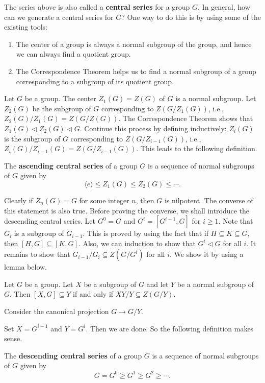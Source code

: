 The series above is also called a \textbf{central series} for a group $G$.
In general, how can we generate a central series for $ G $? One way to do this is by using some of the existing tools: 
\begin{enumerate}[(1)]
	\item The center of a group is always a normal subgroup of the group, and hence we can always find a quotient group.
	\item The Correspondence Theorem helps us to find a normal subgroup of a group corresponding to a subgroup of its quotient group.
\end{enumerate}

Let $ G $ be a group. The center $Z_1(G) =  Z(G) $ of $ G $ is a normal subgroup. Let $ Z_{2}(G) $ be the subgroup of $G$ corresponding to $ Z(G/Z_1(G)) $, i.e., $
	Z_2(G) / Z_1(G) = Z(G/Z(G))$. The Correspondence Theorem shows that $Z_1(G) \lhd Z_2(G) \lhd G$.  Continue this process by defining inductively:  $Z_{i}(G)$ is the subgroup of $G$ corresponding to $ Z(G/Z_{i-1}(G)) $, i.e., $Z_i(G) / Z_{i-1}(G) = Z(G/Z_{i-1}(G))$. This leads to the following definition.

\begin{definition}
 	The \textbf{ascending central series} of a group $G$ is a sequence of normal subgroups of $G$ given by  $$ \langle e \rangle \leq Z_{1}(G) \leq  Z_{2}(G) \leq  \cdots .$$
\end{definition} 
 Clearly if $Z_n (G) = G$ for some integer $n$, then $G$ is nilpotent. The converse of this statement is also true. Before proving the converse, we shall introduce the descending central series. Let $G^0 = G$ and $G^i = [G^{i-1},G]$ for $i\geq 1$. Note that $G_i$ is a subgroup of $G_{i-1}$. This is proved by using the fact that if $H\subseteq K \subseteq G$, then $[H,G]\subseteq [K,G]$. Also, we can induction to show that $G^i\lhd G$  for all $i$. It remains to show that $G_{i-1}/G_i\subseteq Z(G/G^i)$  for all $i$. We show it by using a lemma below.
 \begin{lemma} \label{lemma-for-nilpotent}
 	Let $G$ be a group. Let $X$ be a subgroup of $G$ and let $Y$ be a normal subgroup of $G$. Then $[X,G]\subseteq Y$ if and only if $XY/Y\subseteq Z(G/Y)$.
 \end{lemma}
 \begin{sketch}
 	Consider the canonical projection $G\rightarrow G/Y$.
 \end{sketch}
 Set $X = G^{i-1}$ and $Y = G^i$. Then we are done. So the following definition makes sense.
 \begin{definition}
 	The \textbf{descending central series} of a group $G$ is a sequence of normal subgroups of $G$ given by  $$ G = G^0  \geq G^1 \geq  G^2 \geq  \cdots .$$
 \end{definition}
 
